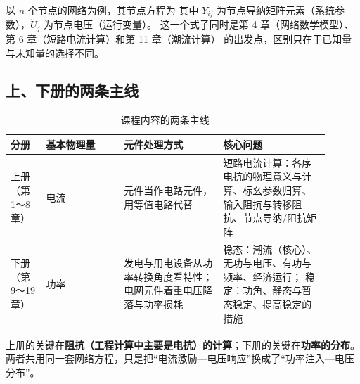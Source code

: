 以 $n$ 个节点的网络为例，其节点方程为
其中 $Y_{ij}$ 为节点导纳矩阵元素（系统参数），$\dot U_j$ 为节点电压（运行变量）。
这一个式子同时是第 4 章（网络数学模型）、第 6 章（短路电流计算）和第 11 章（潮流计算）
的出发点，区别只在于已知量与未知量的选择不同。

\subsection{上、下册的两条主线}

\begin{table}[htbp]
  \centering
  \caption{课程内容的两条主线}
  \small
  \begin{tabular}{@{}p{0.10\linewidth}p{0.22\linewidth}p{0.28\linewidth}p{0.30\linewidth}@{}}
    \toprule
    分册 & 基本物理量 & 元件处理方式 & 核心问题 \\
    \midrule
    上册（第 1～8 章） & 电流 & 元件当作电路元件，用等值电路代替 & 短路电流计算：各序电抗的物理意义与计算、标幺参数归算、
                                           输入阻抗与转移阻抗、节点导纳/阻抗矩阵 \\
    下册（第 9～19 章） & 功率 & 发电与用电设备从功率转换角度看特性；
                          电网元件着重电压降落与功率损耗 & 稳态：潮流（核心）、无功与电压、有功与频率、经济运行；
                                                                     稳定：功角、静态与暂态稳定、提高稳定的措施 \\
    \bottomrule
  \end{tabular}
\end{table}

上册的关键在\textbf{阻抗（工程计算中主要是电抗）的计算}；下册的关键在\textbf{功率的分布}。
两者共用同一套网络方程，只是把“电流激励—电压响应”换成了“功率注入—电压分布”。

